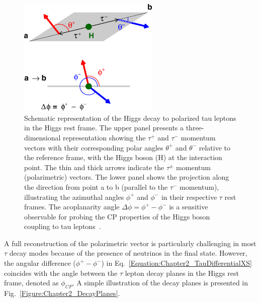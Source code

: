 \begin{figure}[h]
\centering
\includegraphics[width= 0.6\textwidth]{Figures/Chapter2/PolarimetricVector_Definition.png}
\caption{Schematic representation of the Higgs decay to polarized tau leptons in the
Higgs rest frame. The upper panel presents a three-dimensional representation showing the $\tau^+$ and $\tau^-$ momentum vectors with their corresponding polar angles $\theta^+$ and $\theta^-$ relative to the reference frame, with the Higgs boson (H) at the interaction point. The thin and thick arrows indicate the $\tau^\pm$ momentum (polarimetric) vectors. The lower panel shows the projection along the direction from point a to b (parallel to the $\tau^-$ momentum), illustrating the azimuthal angles $\phi^+$ and $\phi^-$ in their respective $\tau$ rest frames. The acoplanarity angle $\Delta\phi = \phi^+ - \phi^-$ is a sensitive observable for probing the CP properties of the Higgs boson coupling to tau leptons~\cite{PolarimetricVectorDefinition}.}
\label{Figure:Chapter2_PolarimetricVector_Definition}
\end{figure}

A full reconstruction of the polarimetric vector is particularly challenging in most $\tau$ decay modes because of the presence of neutrinos in the final state. However, the angular difference ($\phi^+-\phi^-$) in Eq.~\ref{Equation:Chapter2_TauDifferentialXS} coincides with the angle between the $\tau$ lepton decay planes in the Higgs rest frame, denoted as $\phi_{CP}$. A simple illustration of the decay planes is presented in Fig.~\ref{Figure:Chapter2_DecayPlanes}.

